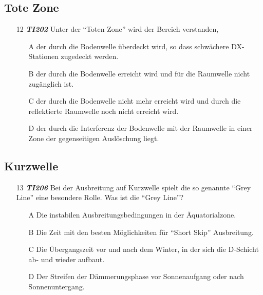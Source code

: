 \subsection*{Tote Zone}

\begin{enumerate} 
\itemsep1pt\parskip0pt
\item[12] \emph{\textbf{TI202}}   Unter der ``Toten Zone'' wird der Bereich verstanden,
	\begin{enumerate}
	\itemsep1pt\parskip0pt
		\item[A] der durch die Bodenwelle überdeckt wird, so dass schwächere DX-Stationen zugedeckt werden.
		\item[B] der durch die Bodenwelle erreicht wird und für die Raumwelle nicht zugänglich ist.
		\item[C] der durch die Bodenwelle nicht mehr erreicht wird und durch die reflektierte Raumwelle noch nicht erreicht wird.
		\item[D] der durch die Interferenz der Bodenwelle mit der Raumwelle in einer Zone der gegenseitigen Auslöschung liegt.
	\end{enumerate}
\end{enumerate}

\subsection*{Kurzwelle}

\begin{enumerate} 
\itemsep1pt\parskip0pt
\item[13] \emph{\textbf{TI206}}   Bei der Ausbreitung auf Kurzwelle spielt die so genannte ``Grey Line'' eine besondere Rolle. Was ist die ``Grey Line''?
	\begin{enumerate}
	\itemsep1pt\parskip0pt
		\item[A] Die instabilen Ausbreitungsbedingungen in der Äquatorialzone.
		\item[B] Die Zeit mit den besten Möglichkeiten für ``Short Skip'' Ausbreitung.
		\item[C] Die Übergangszeit vor und nach dem Winter, in der sich die D-Schicht ab- und wieder aufbaut.
		\item[D] Der Streifen der Dämmerungsphase vor Sonnenaufgang oder nach Sonnenuntergang.
	\end{enumerate}
\end{enumerate}

